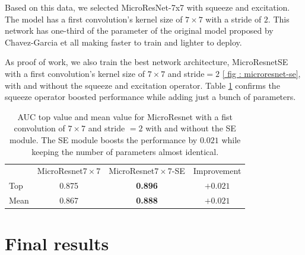 \documentclass[../document.tex]{subfiles}
\begin{document}
Based on this data, we selected MicroResNet-7x7 with squeeze and excitation. The model has a first convolution's kernel size of $7\times7$ with a stride of $2$. This network has one-third of the parameter of the original model proposed by Chavez-Garcia et all \cite{omar2018traversability} making faster to train and lighter to deploy. 

As proof of work, we also train the best network architecture, MicroResnetSE with a first convolution's kernel size of $7 \times 7$ and stride$=2$ \ref{ fig : microresnet-se}, with and without the squeeze and excitation operator. Table \ref{tab : micro-resnet-res-se} confirms the squeeze operator boosted performance while adding just a bunch of parameters.
\begin{table} [htbp]
  \centering
  \begin{tabular}{@{}lccc@{}}
  \toprule
  &  MicroResnet$7\times7$ & MicroResnet$7\times7$-SE  & Improvement \\
  \cline{1-4}
   Top & 0.875 & \textbf{0.896} & $+0.021$ \\
   Mean & 0.867 & \textbf{0.888} & $+0.021$ \\
  \bottomrule   
\end{tabular}
\caption{AUC top value and mean value for MicroResnet with a fist convolution of $7\times7$ and stride $=2$ with and without the SE module. The SE module boosts the performance by $0.021$ while keeping the number of parameters almost identical.}
\label{tab : micro-resnet-res-se}
\end{table}

\section{Final results}
\end{document}
